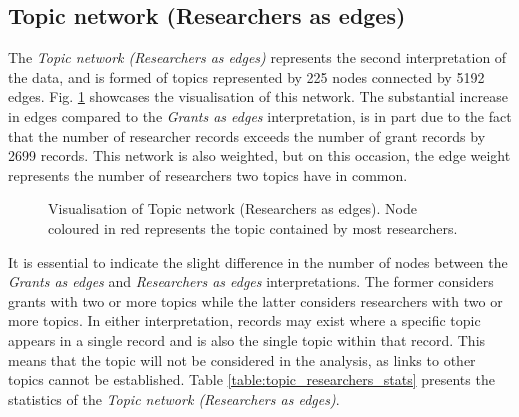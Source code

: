 \subsection{Topic network (Researchers as edges)}

The \textit{Topic network (Researchers as edges)} represents the second interpretation of the data, and is formed of topics represented by 225 nodes connected by 5192 edges. Fig. \ref{fig:topic_b_vis} showcases the visualisation of this network. The substantial increase in edges compared to the \textit{Grants as edges} interpretation, is in part due to the fact that the number of researcher records exceeds the number of grant records by 2699 records. This network is also weighted, but on this occasion, the edge weight represents the number of researchers two topics have in common.

\begin{figure}[htpb]
    \centering
    \caption[Visualisation of Topic network (Researchers as edges)]{Visualisation of Topic network (Researchers as edges). Node coloured in red represents the topic contained by most researchers.}
    \label{fig:topic_b_vis}
\end{figure}

It is essential to indicate the slight difference in the number of nodes between the \textit{Grants as edges} and \textit{Researchers as edges} interpretations. The former considers grants with two or more topics while the latter considers researchers with two or more topics. In either interpretation, records may exist where a specific topic appears in a single record and is also the single topic within that record. This means that the topic will not be considered in the analysis, as links to other topics cannot be established. Table \ref{table:topic_researchers_stats} presents the statistics of the \textit{Topic network (Researchers as edges)}.

